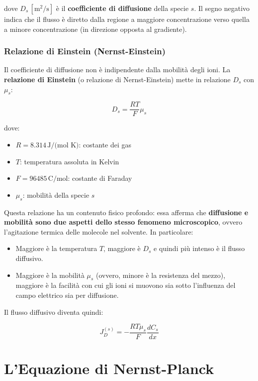 dove $D_s\,[\text{m}^2/\text{s}]$ è il \textbf{coefficiente di diffusione} della specie $s$. Il segno negativo indica che il flusso è diretto dalla regione a maggiore concentrazione verso quella a minore concentrazione (in direzione opposta al gradiente).

\subsubsection{Relazione di Einstein (Nernst-Einstein)}

Il coefficiente di diffusione non è indipendente dalla mobilità degli ioni. La \textbf{relazione di Einstein} (o relazione di Nernst-Einstein) mette in relazione $D_s$ con $\mu_s$:

\begin{equation}
\boxed{D_s = \frac{RT}{F} \mu_s}
\end{equation}

dove:
\begin{itemize}
    \item $R = 8.314\,\text{J/(mol K)}$: costante dei gas
    \item $T$: temperatura assoluta in Kelvin
    \item $F = 96485\,\text{C/mol}$: costante di Faraday
    \item $\mu_s$: mobilità della specie $s$
\end{itemize}

Questa relazione ha un contenuto fisico profondo: essa afferma che \textbf{diffusione e mobilità sono due aspetti dello stesso fenomeno microscopico}, ovvero l'agitazione termica delle molecole nel solvente. In particolare:

\begin{itemize}
    \item Maggiore è la temperatura $T$, maggiore è $D_s$ e quindi più intenso è il flusso diffusivo.
    \item Maggiore è la mobilità $\mu_s$ (ovvero, minore è la resistenza del mezzo), maggiore è la facilità con cui gli ioni si muovono sia sotto l'influenza del campo elettrico sia per diffusione.
\end{itemize}

Il flusso diffusivo diventa quindi:

\begin{equation}
J_D^{(s)} = -\frac{RT\mu_s}{F} \frac{dC_s}{dx}
\end{equation}


\section{L'Equazione di Nernst-Planck}

